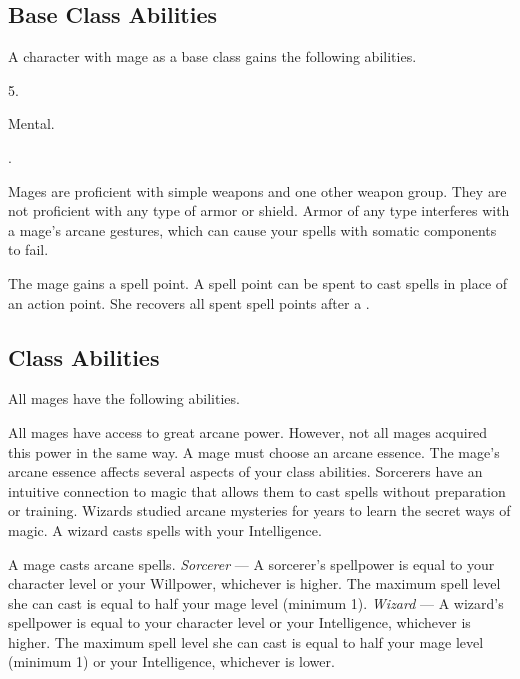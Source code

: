     \subsection{Base Class Abilities}
        A character with mage as a base class gains the following abilities.

         5.

          Mental.

         .

        Mages are proficient with simple weapons and one other weapon group.
        They are not proficient with any type of armor or shield.
        Armor of any type interferes with a mage's arcane gestures, which can cause your spells with somatic components to fail.

        The mage gains a spell point.
        A spell point can be spent to cast spells in place of an action point.
        She recovers all spent spell points after a .

    \subsection{Class Abilities}
        All mages have the following abilities.

        All mages have access to great arcane power.
        However, not all mages acquired this power in the same way.
        A mage must choose an arcane essence.
        The mage's arcane essence affects several aspects of your class abilities.
         Sorcerers have an intuitive connection to magic that allows them to cast spells without preparation or training.
         Wizards studied arcane mysteries for years to learn the secret ways of magic.
        A wizard casts spells with your Intelligence.

        A mage casts arcane spells.
        \textit{Sorcerer} --- A sorcerer's spellpower is equal to your character level or your Willpower, whichever is higher.
        The maximum spell level she can cast is equal to half your mage level (minimum 1).
        \textit{Wizard} --- A wizard's spellpower is equal to your character level or your Intelligence, whichever is higher.
        The maximum spell level she can cast is equal to half your mage level (minimum 1) or your Intelligence, whichever is lower.

